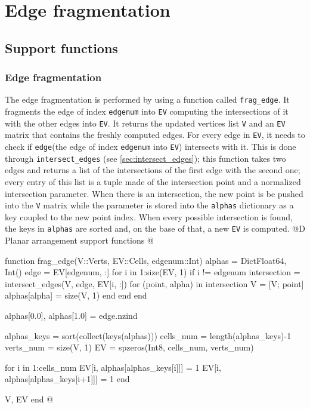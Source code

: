 \documentclass[10pt]{book}
\begin{document}
\section{Edge fragmentation}
\subsection{Support functions}
\subsubsection{Edge fragmentation}
\label{sec:frag_edge}
The edge fragmentation is performed by using a function called \texttt{frag\_edge}.
It fragments the edge of index \texttt{edgenum} into \texttt{EV} computing the intersections of
it with the other edges into \texttt{EV}. It returns the updated vertices list \texttt{V} and an 
\texttt{EV} matrix that contains the freshly computed edges.
For every edge in \texttt{EV}, it needs to check if \texttt{edge}(the edge of index \texttt{edgenum} into 
\texttt{EV}) intersects with it. This is done through \texttt{intersect\_edges} (see \ref{sec:intersect_edges}); 
this function takes two edges and returns a list of the intersections of the first edge with the second one; 
every entry of this list is a tuple made of the intersection point and a normalized intersection parameter. 
When there is an intersection, the new point is be pushed into the \texttt{V} matrix while the parameter 
is stored into the \texttt{alphas} dictionary as a key coupled to the new point index.
When every possible intersection is found, the keys in \texttt{alphas} are sorted and, on the base of that,
a new \texttt{EV} is computed.
@D Planar arrangement support functions
@{function frag_edge(V::Verts, EV::Cells, edgenum::Int)
    alphas = Dict{Float64, Int}()
    edge = EV[edgenum, :]
    for i in 1:size(EV, 1)
        if i != edgenum
            intersection = intersect_edges(V, edge, EV[i, :])
            for (point, alpha) in intersection
                V = [V; point]
                alphas[alpha] = size(V, 1)
            end
        end
    end

    alphas[0.0], alphas[1.0] = edge.nzind

    alphas_keys = sort(collect(keys(alphas)))
    cells_num = length(alphas_keys)-1
    verts_num = size(V, 1)
    EV = spzeros(Int8, cells_num, verts_num)

    for i in 1:cells_num
        EV[i, alphas[alphas_keys[i]]] = 1
        EV[i, alphas[alphas_keys[i+1]]] = 1
    end

    V, EV
end
@}
\end{document}
